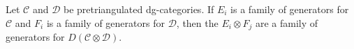 \documentclass[10pt]{amsart}
\begin{document}
\begin{thm}
  Let $\mathcal{C}$ and $\mathcal{D}$ be pretriangulated dg-categories.
  If $E_i$ is a family of generators for $\mathcal{C}$ and $F_i$ is a family of generators for $\mathcal{D}$, then the $E_i \otimes F_j$ are a family of generators for $D\left(\mathcal{C} \otimes \mathcal{D}\right)$.
\end{thm}
\end{document}

